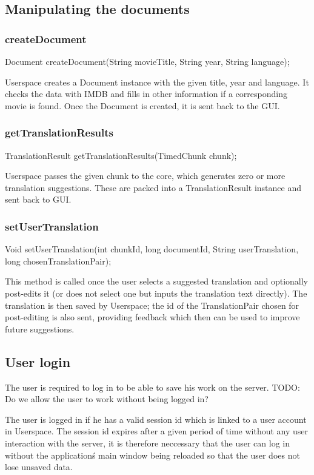 \subsection{Manipulating the documents}

\subsubsection{createDocument}
	Document createDocument(String movieTitle, String year, String language);

Userspace creates a Document instance with the given title, year and language.
It checks the data with IMDB and fills in other information if a corresponding movie is found.
Once the Document is created, it is sent back to the GUI.

\subsubsection{getTranslationResults}
	TranslationResult getTranslationResults(TimedChunk chunk);
	
Userspace passes the given chunk to the core, which generates zero or more translation suggestions.
These are packed into a TranslationResult instance and sent back to GUI.
	
\subsubsection{setUserTranslation}
	Void setUserTranslation(int chunkId, long documentId, String userTranslation, long chosenTranslationPair);

This method is called once the user selects a suggested translation and optionally post-edits it
(or does not select one but inputs the translation text directly).
The translation is then saved by Userspace;
the id of the TranslationPair chosen for post-editing is also sent, providing feedback which then can be used to improve future suggestions.

\subsection{User login}

The user is required to log in to be able to save his work on the server.
TODO: Do we allow the user to work without being logged in?

The user is logged in if he has a valid session id which is linked to a user account in Userspace.
The session id expires after a given period of time without any user interaction with the server,
it is therefore neccessary that the user can log in without the application\'s main window being reloaded so that the user does not lose unsaved data.

